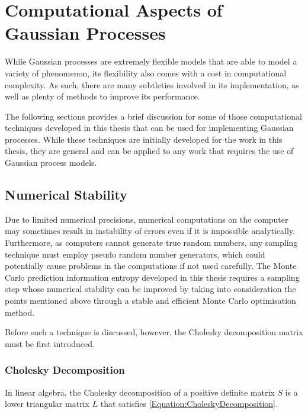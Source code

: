 \chapter{Computational Aspects of Gaussian Processes}
\label{Appendix:ComputationalAspects}

	While Gaussian processes are extremely flexible models that are able to model a variety of phenomenon, its flexibility also comes with a cost in computational complexity. As such, there are many subtleties involved in its implementation, as well as plenty of methods to improve its performance.
	
	The following sections provides a brief discussion for some of those computational techniques developed in this thesis that can be used for implementing Gaussian processes. While these techniques are initially developed for the work in this thesis, they are general and can be applied to any work that requires the use of Gaussian process models. 
	
	\section{Numerical Stability}
	\label{Appendix:ComputationalAspects:NumericalStability}
	
		Due to limited numerical precisions, numerical computations on the computer may sometimes result in instability of errors even if it is impossible analytically. Furthermore, as computers cannot generate true random numbers, any sampling technique must employ pseudo random number generators, which could potentially cause problems in the computations if not used carefully. The Monte Carlo prediction information entropy  developed in this thesis requires a sampling step whose numerical stability can be improved by taking into consideration the points mentioned above through a stable and efficient Monte Carlo optimisation method.
		
		Before such a technique is discussed, however, the Cholesky decomposition matrix must be first introduced.
		
		\subsection{Cholesky Decomposition}
		\label{Appendix:ComputationalAspects:NumericalStability:Cholesky}
			
			In linear algebra, the Cholesky decomposition of a positive definite matrix $S$ is a lower triangular matrix $L$ that satisfies \eqref{Equation:CholeskyDecomposition}.
			

